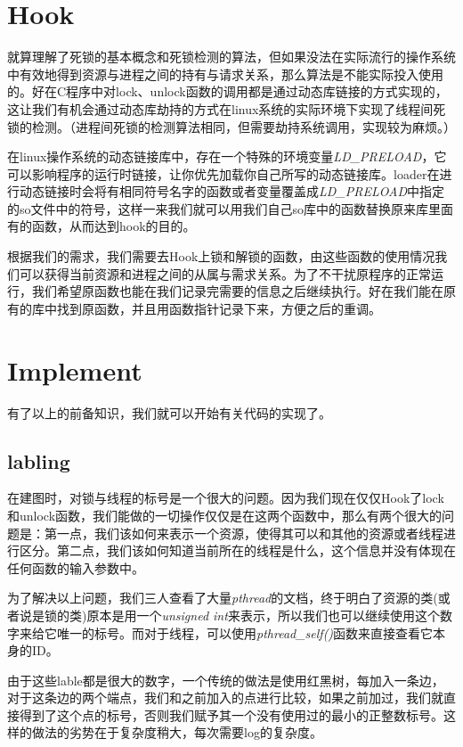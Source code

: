 \documentclass[titlepage]{article}
\begin{document}
\section{Hook}
\indent 就算理解了死锁的基本概念和死锁检测的算法，但如果没法在实际流行的操作系统中有效地得到资源与进程之间的持有与请求关系，那么算法是不能实际投入使用的。好在C程序中对lock、unlock函数的调用都是通过动态库链接的方式实现的，这让我们有机会通过动态库劫持的方式在linux系统的实际环境下实现了线程间死锁的检测。（进程间死锁的检测算法相同，但需要劫持系统调用，实现较为麻烦。）

\indent 在linux操作系统的动态链接库中，存在一个特殊的环境变量\emph{LD\_PRELOAD}，它可以影响程序的运行时链接，让你优先加载你自己所写的动态链接库。loader在进行动态链接时会将有相同符号名字的函数或者变量覆盖成\emph{LD\_PRELOAD}中指定的so文件中的符号，这样一来我们就可以用我们自己so库中的函数替换原来库里面有的函数，从而达到hook的目的。

\indent 根据我们的需求，我们需要去Hook上锁和解锁的函数，由这些函数的使用情况我们可以获得当前资源和进程之间的从属与需求关系。为了不干扰原程序的正常运行，我们希望原函数也能在我们记录完需要的信息之后继续执行。好在我们能在原有的库中找到原函数，并且用函数指针记录下来，方便之后的重调。

\section{Implement}
\indent 有了以上的前备知识，我们就可以开始有关代码的实现了。

\subsection{labling}
\indent 在建图时，对锁与线程的标号是一个很大的问题。因为我们现在仅仅Hook了lock和unlock函数，我们能做的一切操作仅仅是在这两个函数中，那么有两个很大的问题是：第一点，我们该如何来表示一个资源，使得其可以和其他的资源或者线程进行区分。第二点，我们该如何知道当前所在的线程是什么，这个信息并没有体现在任何函数的输入参数中。

\indent 为了解决以上问题，我们三人查看了大量\emph{pthread}的文档，终于明白了资源的类(或者说是锁的类)原本是用一个\emph{unsigned int}来表示，所以我们也可以继续使用这个数字来给它唯一的标号。而对于线程，可以使用\emph{pthread\_self()}函数来直接查看它本身的ID。

\indent 由于这些lable都是很大的数字，一个传统的做法是使用红黑树，每加入一条边，对于这条边的两个端点，我们和之前加入的点进行比较，如果之前加过，我们就直接得到了这个点的标号，否则我们赋予其一个没有使用过的最小的正整数标号。这样的做法的劣势在于复杂度稍大，每次需要log的复杂度。
\end{document}
